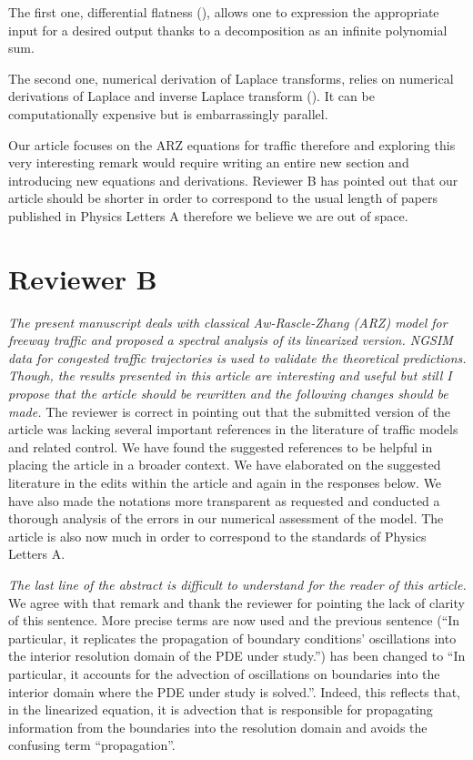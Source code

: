 \documentclass{article}
\begin{document}
The first one, differential flatness (\cite{1184520}), allows one to expression the appropriate input for a desired output thanks to a decomposition as an infinite polynomial sum.

The second one, numerical derivation of Laplace transforms, relies on numerical derivations of Laplace and inverse Laplace transform (\cite{inverse}). It can be computationally expensive but is embarrassingly parallel.

Our article focuses on the ARZ equations for traffic therefore and exploring this very interesting remark would require writing an entire new section and introducing new equations and derivations. Reviewer B has pointed out that our article should be shorter in order to correspond to the usual length of papers published in Physics Letters A therefore we believe we are out of space.


\newpage

\section{Reviewer B}
\emph{
The present manuscript deals with classical Aw-Rascle-Zhang (ARZ) model for freeway traffic and proposed a spectral analysis of its linearized version. NGSIM data for congested traffic trajectories is used to validate the theoretical predictions. Though, the results presented in this article are interesting and useful but still I propose that the article should be rewritten and the following changes should be made.
}
The reviewer is correct in pointing out that the submitted version of the article was lacking several important references in the literature of traffic models and related control. We have found the suggested references to be helpful in placing the article in a broader context. We have elaborated on the suggested literature in the edits within the article and again in the responses below. We have also made the notations more transparent as requested and conducted a thorough analysis of the errors in our numerical assessment of the model. The article is also now much in order to correspond to the standards of Physics Letters A.\\

\bigskip{}

\emph{
The last line of the abstract is difficult to understand for the reader of this article.
}
We agree with that remark and thank the reviewer for pointing the lack of clarity of this sentence.
More precise terms are now used and the previous sentence (``In particular, it replicates the propagation of boundary conditions’ oscillations into the interior resolution domain of the PDE under study.'') has been changed to ``In particular, it accounts for the advection of oscillations on boundaries into the interior domain where the PDE under study is solved.''. Indeed, this reflects that, in the linearized equation, it is advection that is responsible for propagating information from the boundaries into the resolution domain and avoids the confusing term ``propagation''.
\end{document}
